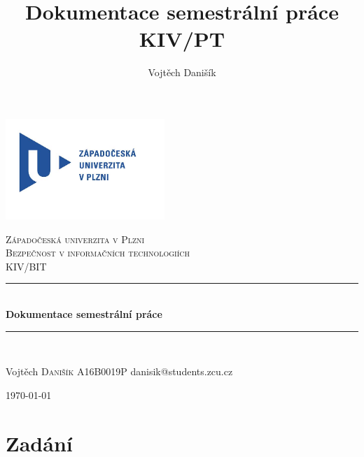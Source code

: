 \documentclass[12pt, a4paper]{article}
\title{\textbf{Dokumentace semestrální práce} \\KIV/PT}
\author{Vojtěch Danišík}
\begin{document}
\begin{titlepage} 
	\newcommand{\HRule}{\rule{\linewidth}{0.5mm}} 
	\begin{center}
	\includegraphics[width=6cm]{img/logo}\\
	\end{center}
	\textsc{\LARGE Západočeská univerzita v Plzni}\\[1.5cm] 	
	\textsc{\Large Bezpečnost v informačních technologiích}\\[0.5cm] 
	\textsc{\large KIV/BIT}\\[0.5cm] 
	\HRule\\[0.4cm]
	{\huge\bfseries Dokumentace semestrální práce}\\[0.4cm] 
	\HRule\\[1.5cm]

	\begin{minipage}{0.4\textwidth}
		\begin{flushleft}
			\large
			Vojtěch \textsc{Danišík}\newline
			A16B0019P\newline
			danisik@students.zcu.cz
		\end{flushleft}
	\end{minipage}
	\vfill\vfill\vfill
	\begin{flushright}
	{\large\today}
	\end{flushright}
	\vfill 
\end{titlepage}
\newpage
\tableofcontents
\newpage
\section{Zadání}
\end{document}
